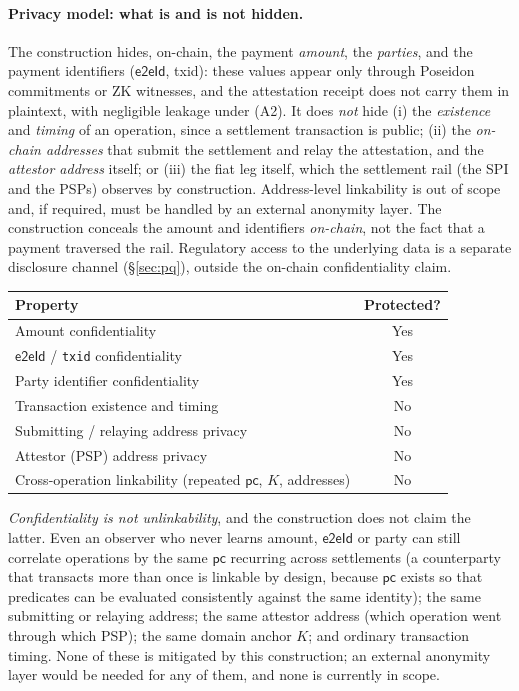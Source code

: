 \documentclass[11pt]{article}
\newcommand{\eeid}{\ensuremath{\mathsf{e2eId}}}
\newcommand{\code}[1]{\texttt{#1}}
\begin{document}
\paragraph{Privacy model: what is and is not hidden.}
The construction hides, on-chain, the payment \emph{amount}, the \emph{parties},
and the payment identifiers (\eeid, txid): these values appear only through
Poseidon commitments or ZK witnesses, and the attestation receipt does not
carry them in plaintext, with negligible leakage under (A2). It does \emph{not}
hide (i) the \emph{existence} and \emph{timing} of an operation, since a
settlement transaction is public; (ii) the \emph{on-chain addresses} that submit
the settlement and relay the attestation, and the \emph{attestor address}
itself; or (iii) the fiat leg itself, which the settlement rail (the SPI and the
PSPs) observes by construction. Address-level linkability is out of scope and,
if required, must be handled by an external anonymity layer. The construction
conceals the amount and identifiers \emph{on-chain}, not the fact that a payment
traversed the rail. Regulatory access to the underlying data is a separate
disclosure channel (\S\ref{sec:pq}), outside the on-chain confidentiality claim.

\begin{center}
\small
\begin{tabular}{@{}lc@{}}
\toprule
\textbf{Property} & \textbf{Protected?} \\
\midrule
Amount confidentiality & Yes \\
\eeid{} / \code{txid} confidentiality & Yes \\
Party identifier confidentiality & Yes \\
Transaction existence and timing & No \\
Submitting / relaying address privacy & No \\
Attestor (PSP) address privacy & No \\
Cross-operation linkability (repeated $\mathsf{pc}$, $K$, addresses) & No \\
\bottomrule
\end{tabular}
\end{center}

\emph{Confidentiality is not unlinkability}, and the construction does not claim
the latter. Even an observer who never learns amount, \eeid{} or party can
still correlate operations by the same $\mathsf{pc}$ recurring across
settlements (a counterparty that transacts more than once is linkable by
design, because $\mathsf{pc}$ exists so that predicates can be evaluated
consistently against the same identity); the same submitting or relaying
address; the same attestor address (which operation went through which PSP);
the same domain anchor $K$; and ordinary transaction timing. None of these is
mitigated by this construction; an external anonymity layer would be needed
for any of them, and none is currently in scope.
\end{document}
